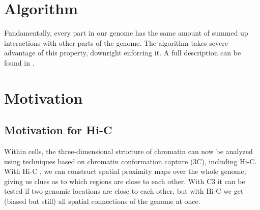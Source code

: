 






\section{Algorithm}\label{sec:algorithm}



Fundamentally, every part in our genome has the same amount of summed up
interactions with other parts of the genome. The algorithm takes severe
advantage of this property, downright enforcing it. A full description can be
found in .



\section{Motivation}\label{sec:motivation}

\subsection{Motivation for Hi-C}


Within cells, the three-dimensional structure of chromatin can now be analyzed
using techniques based on chromatin conformation capture (3C), including Hi-C.
With Hi-C , we can construct spatial proximity
maps over the whole genome, giving us clues as to which regions are close to
each other. With C3 it can be tested if two genomic locations are close to each
other, but with Hi-C we get (biased but still) all spatial connections of the
genome at once.

